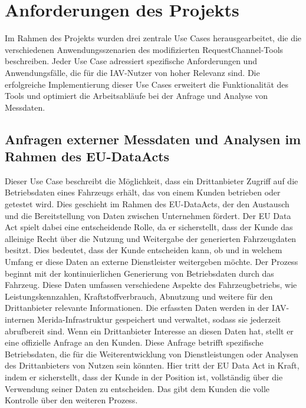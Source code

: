 \chapter{Anforderungen des Projekts}

Im Rahmen des Projekts wurden drei zentrale Use Cases herausgearbeitet, die die verschiedenen Anwendungsszenarien des modifizierten RequestChannel-Tools beschreiben. Jeder Use Case adressiert spezifische Anforderungen und Anwendungsfälle, die für die IAV-Nutzer von hoher Relevanz sind. Die erfolgreiche Implementierung dieser Use Cases erweitert die Funktionalität des Tools und optimiert die Arbeitsabläufe bei der Anfrage und Analyse von Messdaten.
\section{Anfragen externer Messdaten und Analysen im Rahmen des EU-DataActs}
Dieser Use Case beschreibt die Möglichkeit, dass ein Drittanbieter Zugriff auf die Betriebsdaten eines Fahrzeugs erhält, das von einem Kunden betrieben oder getestet wird. Dies geschieht im Rahmen des EU-DataActs, der den Austausch und die Bereitstellung von Daten zwischen Unternehmen fördert. Der EU Data Act spielt dabei eine entscheidende Rolle, da er sicherstellt, dass der Kunde das alleinige Recht über die Nutzung und Weitergabe der generierten Fahrzeugdaten besitzt.  \cite{bmdv2024} Dies bedeutet, dass der Kunde entscheiden kann, ob und in welchem Umfang er diese Daten an externe Dienstleister weitergeben möchte.
\newline
Der Prozess beginnt mit der kontinuierlichen Generierung von Betriebsdaten durch das Fahrzeug. Diese Daten umfassen verschiedene Aspekte des Fahrzeugbetriebs, wie Leistungskennzahlen, Kraftstoffverbrauch, Abnutzung und weitere für den Drittanbieter relevante Informationen. Die erfassten Daten werden in der IAV-internen Merida-Infrastruktur gespeichert und verwaltet, sodass sie jederzeit abrufbereit sind.
\newline
Wenn ein Drittanbieter Interesse an diesen Daten hat, stellt er eine offizielle Anfrage an den Kunden. Diese Anfrage betrifft spezifische Betriebsdaten, die für die Weiterentwicklung von Dienstleistungen oder Analysen des Drittanbieters von Nutzen sein könnten. Hier tritt der EU Data Act in Kraft, indem er sicherstellt, dass der Kunde in der Position ist, vollständig über die Verwendung seiner Daten zu entscheiden. Das gibt dem Kunden die volle Kontrolle über den weiteren Prozess.
\newline
\newline
